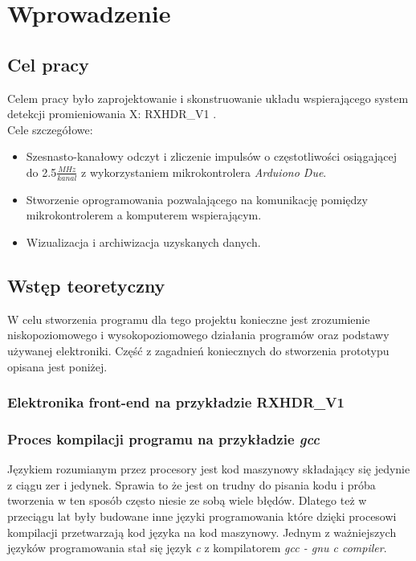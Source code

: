 \section{Wprowadzenie}
\subsection{Cel pracy}

Celem pracy było zaprojektowanie i skonstruowanie układu wspierającego system detekcji promieniowania X: RXHDR\_V1 \cite{master}.\\
Cele szczegółowe:
\begin{itemize}
        \item Szesnasto-kanałowy odczyt i zliczenie impulsów o częstotliwości osiągającej do 2.5$\frac{MHz}{kanal}$ z wykorzystaniem mikrokontrolera \textit{Arduiono Due}.
        \item Stworzenie oprogramowania pozwalającego na komunikację pomiędzy mikrokontrolerem a komputerem wspierającym. 
        \item Wizualizacja i archiwizacja uzyskanych danych. 
\end{itemize}

\subsection{Wstęp teoretyczny}

W celu stworzenia programu dla tego projektu konieczne jest zrozumienie niskopoziomowego i wysokopoziomowego działania programów oraz podstawy używanej elektroniki. Część z zagadnień koniecznych do stworzenia prototypu opisana jest poniżej. 

\subsubsection{Elektronika front-end na przykładzie RXHDR\_V1}

\subsubsection{Proces kompilacji programu na przykładzie \textit{gcc}}

Językiem rozumianym przez procesory jest kod maszynowy składający się jedynie z ciągu zer i jedynek.
Sprawia to że jest on trudny do pisania kodu i próba tworzenia w ten sposób często niesie ze sobą wiele błędów. 
Dlatego też w przeciągu lat były budowane inne języki programowania które dzięki procesowi kompilacji przetwarzają kod języka na kod maszynowy. 
Jednym z ważniejszych języków programowania stał się język \textit{c} z kompilatorem \textit{gcc - gnu c compiler}\cite{gcc}. 

